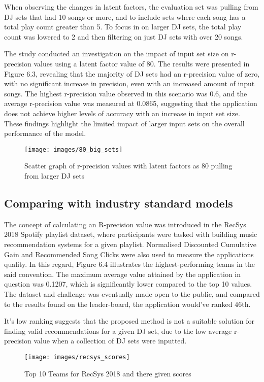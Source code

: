 When observing the changes in latent factors, the evaluation set was pulling from DJ sets that had 10 songs or more, and to include sets where each song has a total play count greater than 5. To  focus in on larger DJ sets, the total play count was lowered to 2 and then filtering on just DJ sets with over 20 songs.

The study conducted an investigation on the impact of input set size on r-precision values using a latent factor value of 80. The results were presented in Figure 6.3, revealing that the majority of DJ sets had an r-precision value of zero, with no significant increase in precision, even with an increased amount of input songs. The highest r-precision value observed in this scenario was 0.6, and the average r-precision value was measured at 0.0865, suggesting that the application does not achieve higher levels of accuracy with an increase in input set size. These findings highlight the limited impact of larger input sets on the overall performance of the model.

\begin{figure}[H]
	\texttt{[image: images/80\_big\_sets]}
	\centering
	\caption{Scatter graph of r-precision values with latent factors as 80 pulling from larger DJ sets} 
\end{figure}


\subsection{Comparing with industry standard models}

The concept of calculating an R-precision value was introduced in the RecSys 2018 Spotify playlist dataset, where participants were tasked with building music recommendation systems for a given playlist. Normalised Discounted Cumulative Gain and Recommended Song Clicks were also used to measure the applications quality. In this regard, Figure 6.4 illustrates the highest-performing teams in the said convention. The maximum average value attained by the application in question was 0.1207, which is significantly lower compared to the top 10 values. The dataset and challenge was eventually made open to the public, and compared to the results found on the leader-board, the application would've ranked 46th. 

It's low ranking suggests that the proposed method is not a suitable solution for finding valid recommendations for a given DJ set, due to the low average r-precision value when a collection of DJ sets were inputted.
\begin{figure}[H]
	\hspace*{-1cm} 
	\texttt{[image: images/recsys\_scores]}
	\caption{Top 10 Teams for RecSys 2018 and there given scores} 
\end{figure}

